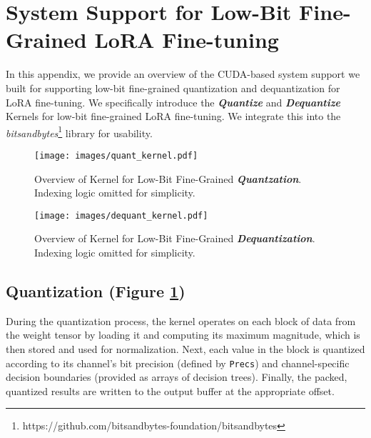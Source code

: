 
\section{\FWName System Support for Low-Bit Fine-Grained LoRA Fine-tuning} \label{app:systemsupport}


In this appendix, we provide an overview of the CUDA-based system support we built for supporting low-bit fine-grained quantization and dequantization for LoRA fine-tuning. We specifically introduce the \textbf{\textit{Quantize}} and \textbf{\textit{Dequantize}} Kernels for low-bit fine-grained LoRA fine-tuning. We integrate this into the \textit{bitsandbytes}\footnote{https://github.com/bitsandbytes-foundation/bitsandbytes} library for usability.


\begin{figure}[ht]
\vspace{-14pt}
\begin{center}
\centerline{\texttt{[image: images/quant\_kernel.pdf]}}
\vskip -0.2in
\caption{Overview of Kernel for Low-Bit Fine-Grained \textbf{\textit{Quantzation}}. Indexing logic omitted for simplicity.}
\label{fig:quant_kernel}
\end{center}
\vskip -0.4in
\end{figure}


\begin{figure}[ht]
\vspace{-14pt}
\begin{center}
\centerline{\texttt{[image: images/dequant\_kernel.pdf]}}
\vskip -0.2in
\caption{Overview of Kernel for Low-Bit Fine-Grained \textbf{\textit{Dequantization}}. Indexing logic omitted for simplicity.}
\label{fig:dequant_kernel}
\end{center}
\vskip -0.5in
\end{figure}

\subsection{Quantization (Figure \ref{fig:quant_kernel})}
During the quantization process, the kernel operates on each block of data from the weight tensor by loading it and computing its maximum magnitude, which is then stored and used for normalization. Next, each value in the block is quantized according to its channel’s bit precision (defined by \texttt{Precs}) and channel-specific decision boundaries (provided as arrays of decision trees). Finally, the packed, quantized results are written to the output buffer at the appropriate offset.



